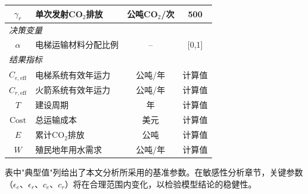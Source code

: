 \begin{table}[htbp]
\begin{tabular}{clcc}
        $\gamma_r$ & 单次发射CO$_2$排放 & 公吨CO$_2$/次 & 500 \\
        \midrule
        \multicolumn{4}{l}{\textit{决策变量}} \\
        $\alpha$ & 电梯运输材料分配比例 & -- & [0,1] \\
        \midrule
        \multicolumn{4}{l}{\textit{结果指标}} \\
        $C_{e,\text{eff}}$ & 电梯系统有效年运力 & 公吨/年 & 计算值 \\
        $C_{r,\text{eff}}$ & 火箭系统有效年运力 & 公吨/年 & 计算值 \\
        $T$ & 建设周期 & 年 & 计算值 \\
        $\text{Cost}$ & 总运输成本 & 美元 & 计算值 \\
        $E$ & 累计CO$_2$排放 & 公吨 & 计算值 \\
        $W$ & 殖民地年用水需求 & 公吨/年 & 计算值 \\
        \bottomrule
    \end{tabular}
\end{table}

表中"典型值"列给出了本文分析所采用的基准参数。在敏感性分析章节，关键参数（$\epsilon_e$、$\epsilon_r$、$c_e$、$c_r$）将在合理范围内变化，以检验模型结论的稳健性。
